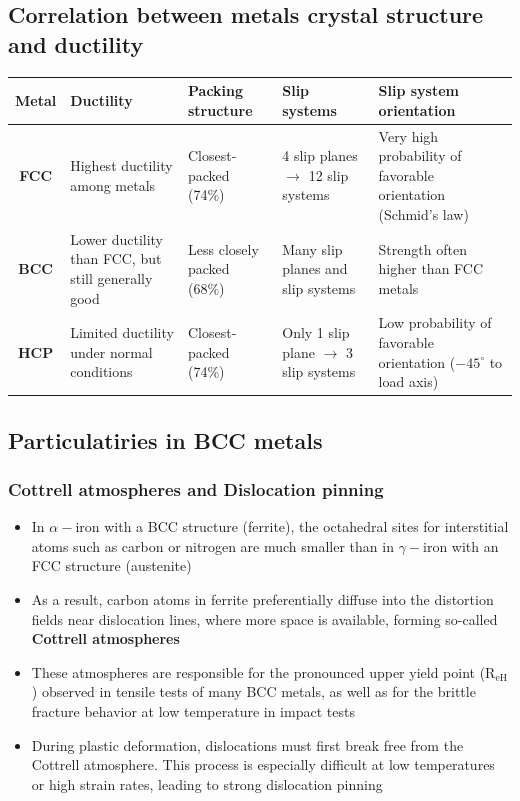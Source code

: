 \documentclass{article}
\begin{document}
\vspace*{-3cm}

\subsection{Correlation between metals crystal structure and ductility}

\renewcommand{\arraystretch}{1.3} %
\begin{tabularx}{\textwidth}{|c|X|l|X|X|}
\hline
\textbf{Metal} & \textbf{Ductility} & \textbf{Packing structure} & \textbf{Slip systems} & \textbf{Slip system orientation} \\
\hline
\textbf{FCC} &
Highest ductility among metals &
Closest-packed (74\%) &
4 slip planes $\rightarrow$ 12 slip systems &
Very high probability of favorable orientation (Schmid's law) \\
\hline
\textbf{BCC} &
Lower ductility than FCC, but still generally good &
Less closely packed (68\%) &
Many slip planes and slip systems &
Strength often higher than FCC metals \\
\hline
\textbf{HCP} &
Limited ductility under normal conditions &
Closest-packed (74\%) &
Only 1 slip plane $\rightarrow$ 3 slip systems &
Low probability of favorable orientation ($-45^\circ$ to load axis) \\
\hline
\end{tabularx}

\newpage
\subsection{Particulatiries in BCC metals}
\subsubsection{Cottrell atmospheres and Dislocation pinning}
\begin{itemize}
  \item In $\alpha-$iron with a BCC structure (ferrite), the octahedral sites for interstitial atoms such as carbon or nitrogen are much smaller than in $\gamma-$iron with an FCC structure (austenite)
  \item As a result, carbon atoms in ferrite preferentially diffuse into the distortion fields near dislocation lines, where more space is available, forming so-called \textbf{Cottrell atmospheres}
  \item {\color{red}These atmospheres are responsible for the pronounced upper yield point (R$_\text{eH}$) observed in tensile tests of many BCC metals, as well as for the brittle fracture behavior at low temperature in impact tests}
  \item During plastic deformation, dislocations must first break free from the Cottrell atmosphere. This process is especially difficult at low temperatures or high strain rates, leading to strong dislocation pinning
\end{itemize}
\end{document}
